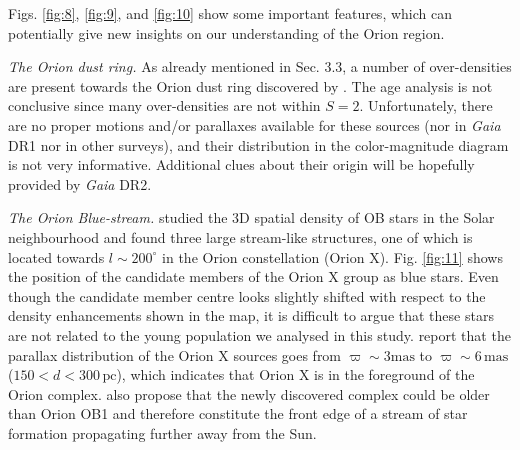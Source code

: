 \documentclass[twocolumn]{aa}
\begin{document}
\noindent
Figs. \ref{fig:8}, \ref{fig:9}, and \ref{fig:10}  show some important features, which can potentially give new insights on our understanding of the Orion region.

\textit{The Orion dust ring.} As already mentioned in Sec. 3.3, a number of over-densities are present towards the Orion dust ring discovered by \cite{Schlafly2015}. The age analysis is not conclusive since many over-densities are not within $S = 2$. Unfortunately, there are no proper motions and/or parallaxes available for these sources (nor in \textit{Gaia} DR1 nor in other surveys), and their distribution in the color-magnitude diagram is not very informative. Additional clues about their origin will be hopefully provided by \textit{Gaia} DR2.

\textit{The Orion Blue-stream.} \cite{Bouy2015} studied the 3D spatial density of OB stars in the Solar neighbourhood and found three large stream-like structures, one of which is located towards $l \sim 200^{\circ}$ in the Orion constellation (Orion X). Fig. \ref{fig:11} shows the position of the candidate members of the Orion X group as blue stars. Even though the candidate member centre looks slightly shifted with respect to the density enhancements shown in the map, it is difficult to argue that these stars are not related to the young population we analysed in this study. \cite{Bouy2015} report that the parallax distribution of the Orion X sources goes from $\varpi \sim 3 \mathrm{mas}$ to $\varpi \sim 6 \, \mathrm{mas}$ ($150 < d < 300 \, \mathrm{pc}$), which indicates that Orion X is  in the foreground of the Orion complex. \cite{Bouy2015}  also propose that the newly discovered complex could be older than Orion OB1 and therefore constitute the front edge of a stream of star formation propagating further away from the Sun.
\end{document}

